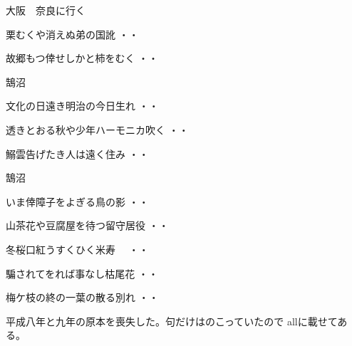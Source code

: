 \vspace{0.6cm}
大阪　奈良に行く
\begin{shiika}栗むくや消えぬ弟の国訛
\hfill{・・}\end{shiika}
\begin{shiika}故郷もつ倖せしかと柿をむく
\hfill{・・}\end{shiika}
\vspace{0.6cm}
鵠沼
\begin{shiika}文化の日遠き明治の今日生れ
\hfill{・・}\end{shiika}
\begin{shiika}透きとおる秋や少年ハーモニカ吹く
\hfill{・・}\end{shiika}
\begin{shiika}鰯雲告げたき人は遠く住み
\hfill{・・}\end{shiika}
鵠沼
\begin{shiika}いま倖障子をよぎる鳥の影
\hfill{・・}\end{shiika}
\begin{shiika}山茶花や豆腐屋を待つ留守居役
\hfill{・・}\end{shiika}
\begin{shiika}冬桜口紅うすくひく米寿　
\hfill{・・}\end{shiika}
\begin{shiika}騙されてをれば事なし枯尾花
\hfill{・・}\end{shiika}
\begin{shiika}梅ケ枝の終の一葉の散る別れ
\hfill{・・}\end{shiika}
\vspace{0.6cm}
平成八年と九年の原本を喪失した。句だけはのこっていたので
allに載せてある。
\endinput
\begin{shiika}いつまでも御元気でねてふ賀状の数　
\hfill{\rensuji*{8}・\rensuji*{0}・\rensuji*{0}}\end{shiika}
\vspace{0.6cm}
\begin{shiika}退職と一筆添へし賀状かな　　　　　
\hfill{\rensuji*{8}・\rensuji*{0}・\rensuji*{0}}\end{shiika}
\vspace{0.6cm}
\begin{shiika}初入日三六六の一を呑み
\hfill{\rensuji*{8}・\rensuji*{0}・\rensuji*{0}}\end{shiika}
